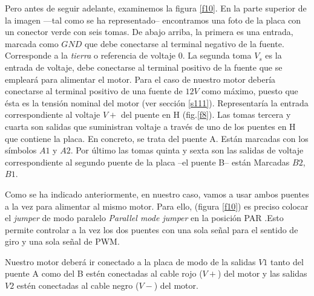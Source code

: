 \documentclass[10pt,a4paper]{report}
\begin{document}
Pero antes de seguir adelante, examinemos la figura \ref{f10}. En la parte superior de la imagen ---tal como se ha representado-- encontramos una foto de la placa con un conector verde con seis tomas. De abajo arriba, la primera es una entrada, marcada como $GND$ que debe conectarse al terminal negativo de la fuente. Corresponde a la \emph{tierra} o referencia de voltaje $0$. La segunda toma $V_{s}$ es la entrada de voltaje, debe conectarse al terminal positivo de la fuente que se empleará para alimentar el motor. Para el caso de nuestro motor debería conectarse al terminal positivo de una fuente de $12V$ como máximo, puesto que ésta es la tensión nominal del motor (ver sección \ref{s111}). Representaría la entrada correspondiente al voltaje $V+$ del puente en H (fig.\ref{f8}).  Las tomas tercera y cuarta son salidas que suministran voltaje a través de uno de los puentes en H que contiene la placa. En concreto, se trata del puente A. Están marcadas con los símbolos $A1$ y $A2$. Por último las tomas quinta y sexta son las salidas de voltaje correspondiente al segundo puente de la placa --el puente B-- están Marcadas $B2$, $B1$.

Como se ha indicado anteriormente, en nuestro caso, vamos a usar ambos puentes a la vez para alimentar al mismo motor. Para ello,  (figura \ref{f10}) es preciso colocar el \emph{jumper} de modo paralelo \emph{Parallel mode jumper} en la posición PAR .Esto permite controlar a la vez los dos puentes con una sola señal para el sentido de giro y una sola señal de PWM.

Nuestro motor deberá ir conectado a la placa de modo de la salidas $V1$ tanto del puente A como del B estén conectadas al  cable rojo ($V+$) del motor y las salidas $V2$ estén conectadas al cable negro ($V-$) del motor. 
\end{document}
